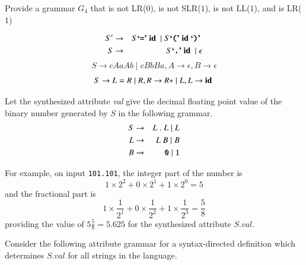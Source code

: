 \documentclass[12pt]{article}
\newcommand{\term}[1]{\mbox{\textbf{#1}\ }}
\newcommand{\termchar}[1]{\mbox{\textbf{`\texttt{#1}'}\ }}
\begin{document}
\begin{exe}
\begin{xlist}
{\ex Provide a grammar $G_4$ that is not LR($0$), is not SLR($1$), is not LL($1$), and is LR($1$)
\begin{soln}
\begin{eqnarray*}
S' & \rightarrow & S \termchar{=} \term{id} \mid S \termchar{(} \term{id} \termchar{)} \\
S & \rightarrow & S \termchar{.} \term{id} \mid \epsilon
\end{eqnarray*}
\[ S \rightarrow cAaAb \mid cBbBa, A \rightarrow \epsilon, B \rightarrow \epsilon \]
\[ S \rightarrow L=R \mid R, R \rightarrow R \ast \mid L, L \rightarrow \term{id} \]
\end{soln}
}

\end{xlist}

\newpage

\ex Let the synthesized attribute {\em val} give the decimal
  floating point value of the binary number generated by $S$ in the
  following grammar.
  \begin{eqnarray}
    S & \rightarrow & L\ {\tt .}\ L \mid L \nonumber\\
    L  & \rightarrow & L\ B \mid B \nonumber\\
    B  & \rightarrow & {\tt 0} \mid {\tt 1} \nonumber
  \end{eqnarray}

  For example, on input {\tt 101.101}, the integer part of the number is
  \[ 1 \times 2^2 + 0 \times 2^1 + 1 \times 2^0 = 5 \]
  and the fractional part is 
  \[ 1 \times \frac{1}{2^1} + 0 \times \frac{1}{2^2} + 1 \times
  \frac{1}{2^3} = \frac{5}{8} \] 
  providing the value of $5 \frac{5}{8} =
  5.625$ for the synthesized attribute $S.\textit{val}$.


  Consider the following attribute grammar for a syntax-directed
  definition which determines $S.\textit{val}$ for all strings in the
  language. 


\end{exe}
\end{document}
